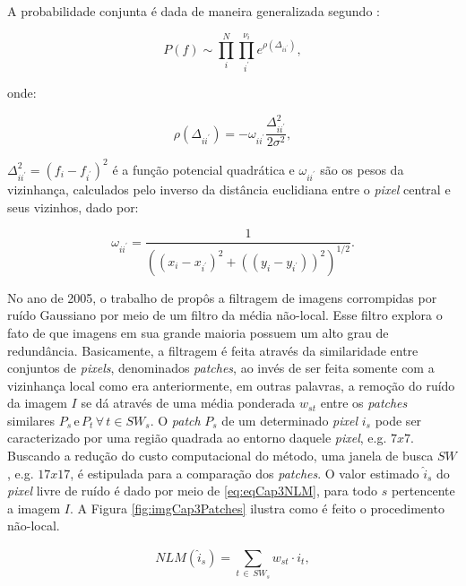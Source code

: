 {{A probabilidade conjunta é dada de maneira generalizada segundo :

\begin{equation}
P(f) \sim \prod_{i}^{N} \prod_{i^{'}}^{\nu_{i}} e^{\rho(\varDelta_{ii^{'}})},
\label{eq:eqCap3GMRF2}
\end{equation} 

\noindent onde: 

\begin{equation}
\rho(\varDelta_{ii^{'}}) = - \omega_{ii^{'}} \dfrac{\varDelta_{ii^{'}}^{2}}{2\sigma^{2}},
\label{eq:eqCap3GMRF3}
\end{equation}

\noindent $\varDelta_{ii^{'}}^{2} = (f_{i}-f_{i^{'}})^{2}$ é a função potencial quadrática e $\omega_{ii^{'}}$ são os pesos da vizinhança, calculados pelo inverso da distância euclidiana entre o \textit{pixel} central e seus vizinhos, dado por:

\begin{equation}
\omega_{ii^{'}} = \dfrac{1}{((x_{i}-x_{i^{'}})^{2}+((y_{i}-y_{i^{'}}))^{2})^{1/2}}.
\label{eq:eqCap3GMRF4}
\end{equation}

No ano de 2005, o trabalho de  propôs a filtragem de imagens corrompidas por ruído Gaussiano por meio de um filtro da média não-local. Esse filtro explora o fato de que imagens em sua grande maioria possuem um alto grau de redundância. Basicamente, a filtragem é feita através da similaridade entre conjuntos de \textit{pixels}, denominados \textit{patches}, ao invés de ser feita somente com a vizinhança local como era anteriormente, em outras palavras, a remoção do ruído da imagem $I$ se dá através de uma média ponderada $w_{st}$ entre os \textit{patches} similares $P_{s}\, \text{e}\, P_{t} \, \forall \, t \in SW_{s}$. O \textit{patch} $P_{s}$ de um determinado \textit{pixel} $i_{s}$ pode ser caracterizado por uma região quadrada ao entorno daquele \textit{pixel}, e.g. $7x7$. Buscando a redução do custo computacional do método, uma janela de busca $SW$, e.g. $17x17$, é estipulada para a comparação dos \textit{patches}. O valor estimado $\hat{i}_{s}$ do \textit{pixel} livre de ruído é dado por meio de \eqref{eq:eqCap3NLM}, para todo $s$ pertencente a imagem $I$. A Figura \ref{fig:imgCap3Patches} ilustra como é feito o procedimento não-local. 

\begin{equation}
NLM(\hat{i}_{s}) = \sum_{t \,\in\, SW_{s}}^{} w_{st} \cdot i_{t},
\label{eq:eqCap3NLM}
\end{equation}


}}
